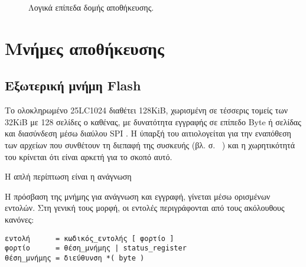 \begin{figure}
    \caption{Λογικά επίπεδα δομής αποθήκευσης.\label{fig:log:structure}}
\begin{center}%
    \def\svgwidth{0.7\textwidth}
    
\end{center}
\end{figure}


\section{Μνήμες αποθήκευσης} %

\subsection{Εξωτερική μνήμη Flash}

Το ολοκληρωμένο 25LC1024 διαθέτει 128KiB, χωρισμένη σε τέσσερις τομείς των 32KiB
με 128 σελίδες ο καθένας, με δυνατότητα εγγραφής σε επίπεδο Byte ή σελίδας και
διασύνδεση μέσω διαύλου SPI \parencite[1]{25lc1024}.
Η ύπαρξή του αιτιολογείται για την εναπόθεση των αρχείων που συνθέτουν τη
διεπαφή της συσκευής (βλ.  σ.~%
\pageref{subsec:network:files}) και η χωρητικότητά του κρίνεται ότι είναι αρκετή
για το σκοπό αυτό.




Η απλή περίπτωση είναι η ανάγνωση 

Η πρόσβαση της μνήμης για ανάγνωση και εγγραφή, γίνεται μέσω ορισμένων εντολών.
Στη γενική τους μορφή, οι εντολές περιγράφονται από τους ακόλουθους κανόνες:
\begin{lstlisting}
εντολή      = κωδικός_εντολής [ φορτίο ]
φορτίο      = θέση_μνήμης | status_register
θέση_μνήμης = διεύθυνση *( byte )
\end{lstlisting}

%

